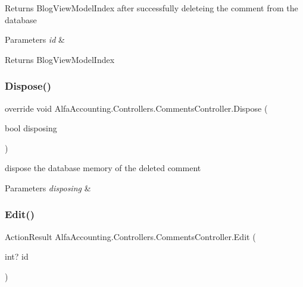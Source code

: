 Returns Blog\+View\+Model\+Index after successfully deleteing the comment from the database 


\begin{DoxyParams}{Parameters}
{\em id} & \\
\hline
\end{DoxyParams}
\begin{DoxyReturn}{Returns}
Blog\+View\+Model\+Index 
\end{DoxyReturn}
\mbox{\label{class_alfa_accounting_1_1_controllers_1_1_comments_controller_a39958b019025eecac9c85cd8acf6f1db}} 
\subsubsection{\texorpdfstring{Dispose()}{Dispose()}}
{\footnotesize\ttfamily override void Alfa\+Accounting.\+Controllers.\+Comments\+Controller.\+Dispose (\begin{DoxyParamCaption}\item[{bool}]{disposing }\end{DoxyParamCaption})\hspace{0.3cm}{\ttfamily [protected]}}



dispose the database memory of the deleted comment 


\begin{DoxyParams}{Parameters}
{\em disposing} & \\
\hline
\end{DoxyParams}
\mbox{\label{class_alfa_accounting_1_1_controllers_1_1_comments_controller_a493788d37b588a20e84e4f5a6f056e4a}} 
\subsubsection{\texorpdfstring{Edit()}{Edit()}\hspace{0.1cm}{\footnotesize\ttfamily [1/2]}}
{\footnotesize\ttfamily Action\+Result Alfa\+Accounting.\+Controllers.\+Comments\+Controller.\+Edit (\begin{DoxyParamCaption}\item[{int?}]{id }\end{DoxyParamCaption})}



